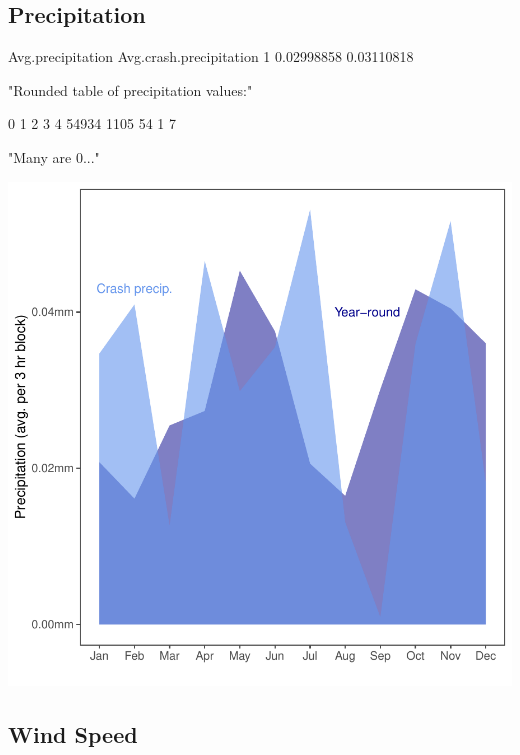 \documentclass[11pt, a4paper]{article}
\begin{document}
\pagebreak
\subsection{Precipitation}

\begin{Schunk}
\begin{Soutput}
  Avg.precipitation Avg.crash.precipitation
1        0.02998858              0.03110818
\end{Soutput}
\begin{Soutput}
[1] "Rounded table of precipitation values:"
\end{Soutput}
\begin{Soutput}
    0     1     2     3     4 
54934  1105    54     1     7 
\end{Soutput}
\begin{Soutput}
[1] "Many are 0..."
\end{Soutput}
\end{Schunk}
\includegraphics{variableinvestigation-012}


\pagebreak
\subsection{Wind Speed}
\end{document}
